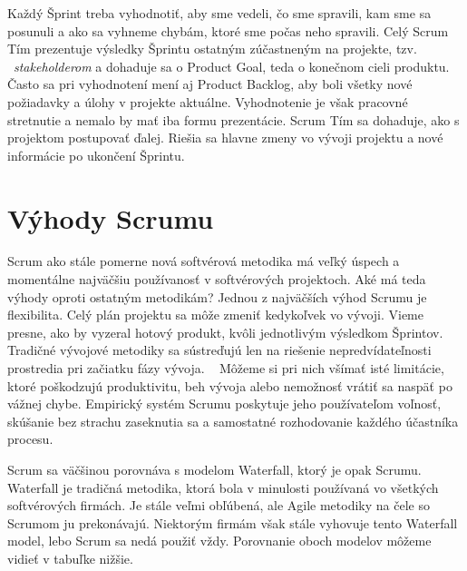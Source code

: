 \documentclass[10pt,slovak,a4paper]{article}
\begin{document}
Každý Šprint treba vyhodnotiť, aby sme vedeli, čo sme spravili, kam sme sa posunuli a ako sa vyhneme chybám, ktoré sme počas neho spravili. Celý Scrum Tím prezentuje výsledky Šprintu ostatným zúčastneným na projekte, tzv. ~\emph{stakeholderom} a dohaduje sa o Product Goal, teda o konečnom cieli produktu. Často sa pri vyhodnotení mení aj Product Backlog, aby boli všetky nové požiadavky a úlohy v projekte aktuálne. Vyhodnotenie je však pracovné stretnutie a nemalo by mať iba formu prezentácie. Scrum Tím sa dohaduje, ako s projektom postupovať ďalej. Riešia sa hlavne zmeny vo vývoji projektu a nové informácie po ukončení Šprintu. ~\cite{schwaber2020scrum}

\section{Výhody Scrumu} \label{vyhody}

Scrum ako stále pomerne nová softvérová metodika má veľký úspech a momentálne najväčšiu používanosť v softvérových projektoch. Aké má teda výhody oproti ostatným metodikám? Jednou z najväčších výhod Scrumu je flexibilita. Celý plán projektu sa môže zmeniť kedykoľvek vo vývoji. Vieme presne, ako by vyzeral hotový produkt, kvôli jednotlivým výsledkom Šprintov. Tradičné vývojové metodiky sa sústreďujú len na riešenie nepredvídateľnosti prostredia pri začiatku fázy vývoja. ~\cite{schwaber1997scrum} Môžeme si pri nich všímať isté limitácie, ktoré poškodzujú produktivitu, beh vývoja alebo nemožnosť vrátiť sa naspäť po vážnej chybe. Empirický systém Scrumu poskytuje jeho používateľom voľnosť, skúšanie bez strachu zaseknutia sa a samostatné rozhodovanie každého účastníka procesu.

Scrum sa väčšinou porovnáva s modelom Waterfall, ktorý je opak Scrumu. Waterfall je tradičná metodika, ktorá bola v minulosti používaná vo všetkých softvérových firmách. Je stále veľmi obľúbená, ale Agile metodiky na čele so Scrumom ju prekonávajú. Niektorým firmám však stále vyhovuje tento Waterfall model, lebo Scrum sa nedá použiť vždy. Porovnanie oboch modelov môžeme vidieť v tabuľke nižšie.
\end{document}
